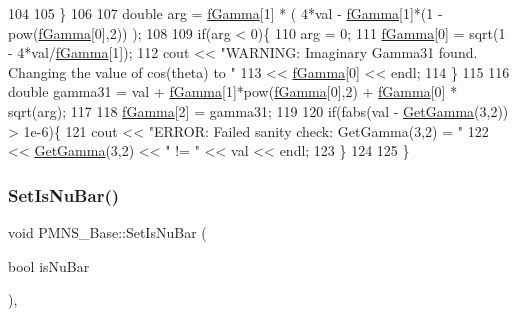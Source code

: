 \begin{DoxyCode}
104          
105   \}
106 
107   \textcolor{keywordtype}{double} arg = \hyperlink{classOscProb_1_1PMNS__Deco_ae2f30ac9f8b25344959f1698616d337a}{fGamma}[1] * ( 4*val - \hyperlink{classOscProb_1_1PMNS__Deco_ae2f30ac9f8b25344959f1698616d337a}{fGamma}[1]*(1 - pow(\hyperlink{classOscProb_1_1PMNS__Deco_ae2f30ac9f8b25344959f1698616d337a}{fGamma}[0],2)) );
108 
109   \textcolor{keywordflow}{if}(arg < 0)\{
110     arg = 0;
111     \hyperlink{classOscProb_1_1PMNS__Deco_ae2f30ac9f8b25344959f1698616d337a}{fGamma}[0] = sqrt(1 - 4*val/\hyperlink{classOscProb_1_1PMNS__Deco_ae2f30ac9f8b25344959f1698616d337a}{fGamma}[1]);
112     cout << \textcolor{stringliteral}{"WARNING: Imaginary Gamma31 found. Changing the value of cos(theta) to "} 
113          << \hyperlink{classOscProb_1_1PMNS__Deco_ae2f30ac9f8b25344959f1698616d337a}{fGamma}[0] << endl;
114   \}
115   
116   \textcolor{keywordtype}{double} gamma31 = val + \hyperlink{classOscProb_1_1PMNS__Deco_ae2f30ac9f8b25344959f1698616d337a}{fGamma}[1]*pow(\hyperlink{classOscProb_1_1PMNS__Deco_ae2f30ac9f8b25344959f1698616d337a}{fGamma}[0],2) + \hyperlink{classOscProb_1_1PMNS__Deco_ae2f30ac9f8b25344959f1698616d337a}{fGamma}[0] * sqrt(arg);
117   
118   \hyperlink{classOscProb_1_1PMNS__Deco_ae2f30ac9f8b25344959f1698616d337a}{fGamma}[2] = gamma31;
119   
120   \textcolor{keywordflow}{if}(fabs(val - \hyperlink{classOscProb_1_1PMNS__Deco_a73461e806063588a8e3a9d5d0dd201cb}{GetGamma}(3,2)) > 1e-6)\{
121     cout << \textcolor{stringliteral}{"ERROR: Failed sanity check: GetGamma(3,2) = "}
122          << \hyperlink{classOscProb_1_1PMNS__Deco_a73461e806063588a8e3a9d5d0dd201cb}{GetGamma}(3,2) << \textcolor{stringliteral}{" != "} << val << endl;
123   \}
124   
125 \}
\end{DoxyCode}
\mbox{\label{classOscProb_1_1PMNS__Base_a717e0348cf762f3961854e332a9b52e0}} 
\subsubsection{\texorpdfstring{Set\+Is\+Nu\+Bar()}{SetIsNuBar()}}
{\footnotesize\ttfamily void P\+M\+N\+S\+\_\+\+Base\+::\+Set\+Is\+Nu\+Bar (\begin{DoxyParamCaption}\item[{bool}]{is\+Nu\+Bar }\end{DoxyParamCaption})\hspace{0.3cm}{\ttfamily [virtual]}, {\ttfamily [inherited]}}

